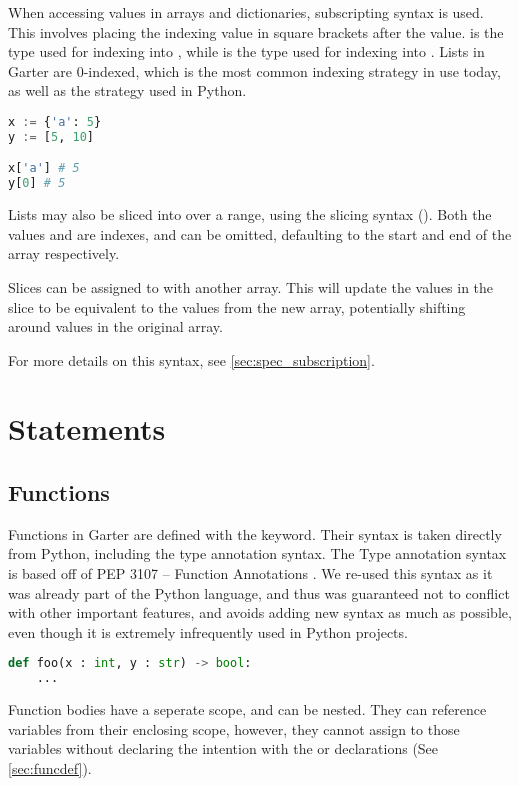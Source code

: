When accessing values in arrays and dictionaries, subscripting syntax is used.
This involves placing the indexing value in square brackets after the value.
 is the type used for indexing into \code{[T]}, while  is the
type used for indexing into . Lists in Garter are 0-indexed,
which is the most common indexing strategy in use today, as well as the strategy
used in Python.

\begin{lstlisting}[language=Python]
x := {'a': 5}
y := [5, 10]

x['a'] # 5
y[0] # 5
\end{lstlisting}

Lists may also be sliced into over a range, using the slicing syntax
(\code{[S:E]}). Both the values  and  are indexes, and can be
omitted, defaulting to the start and end of the array respectively.

Slices can be assigned to with another array. This will update the values in the
slice to be equivalent to the values from the new array, potentially shifting
around values in the original array.

For more details on this syntax, see \ref{sec:spec_subscription}.

\section{Statements}

\subsection{Functions}
Functions in Garter are defined with the  keyword. Their syntax is taken
directly from Python, including the type annotation syntax. The Type annotation
syntax is based off of PEP 3107 -- Function Annotations \cite{pythonfuncannot}.
We re-used this syntax as it was already part of the Python language, and thus
was guaranteed not to conflict with other important features, and avoids
adding new syntax as much as possible, even though it is extremely infrequently
used in Python projects.

\begin{lstlisting}[language=Python]
def foo(x : int, y : str) -> bool:
    ...
\end{lstlisting}

Function bodies have a seperate scope, and can be nested. They can reference
variables from their enclosing scope, however, they cannot assign to those
variables without declaring the intention with the  or
 declarations (See \ref{sec:funcdef}).

